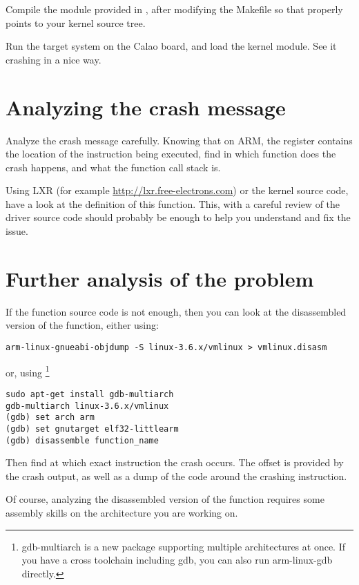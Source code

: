 Compile the  module provided
  in , after modifying the Makefile so
  that  properly points to your kernel source tree.

Run the target system on the Calao board, and load the 
kernel module. See it crashing in a nice way.

\section{Analyzing the crash message}

Analyze the crash message carefully. Knowing that on ARM, the 
register contains the location of the instruction being executed, find
in which function does the crash happens, and what the function call
stack is.

Using LXR (for example \url{http://lxr.free-electrons.com}) or the
kernel source code, have a look at the definition of this
function. This, with a careful review of the driver source code should
probably be enough to help you understand and fix the issue.

\section{Further analysis of the problem}

If the function source code is not enough, then you can look at the
disassembled version of the function, either using:

\begin{verbatim}
arm-linux-gnueabi-objdump -S linux-3.6.x/vmlinux > vmlinux.disasm
\end{verbatim}

or, using \footnote{gdb-multiarch is a new package
  supporting multiple architectures at once. If you have a cross
  toolchain including gdb, you can also run arm-linux-gdb directly.}

\begin{verbatim}
sudo apt-get install gdb-multiarch
gdb-multiarch linux-3.6.x/vmlinux
(gdb) set arch arm
(gdb) set gnutarget elf32-littlearm
(gdb) disassemble function_name
\end{verbatim}

Then find at which exact instruction the crash occurs. The offset is
provided by the crash output, as well as a dump of the code around the
crashing instruction.

Of course, analyzing the disassembled version of the function requires
some assembly skills on the architecture you are working on.
